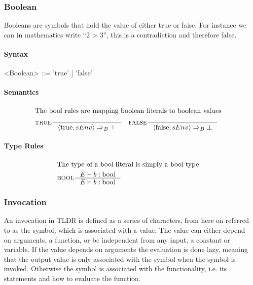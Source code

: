 \subsubsection{Boolean}
Booleans are symbols that hold the value of either true or false. For instance we can in mathematics write \enquote{2 > 3}, this is a contradiction and therefore false.

\paragraph{Syntax}

\begin{grammar}
<Boolean> ::= 'true' | 'false'
\end{grammar}

\paragraph{Semantics}

\begin{align*}
\intertext{The bool rules are mapping boolean literals to boolean values}
&\inference[TRUE]{}
                   {\Braket{\Ttrue,sEnv} \Rightarrow_B \top}
&\inference[FALSE]{}
                   {\Braket{\Tfalse,sEnv} \Rightarrow_B \bot}
\end{align*}

\paragraph{Type Rules}

\begin{align*}
\intertext{The type of a bool literal is simply a bool type}
&\inference[BOOL]{\Tenv b:\Tbool}
                 {\Tenv b: \Tbool}
\end{align*}

\subsubsection{Invocation}\label{subsubsec:invocation}
An invocation in TLDR is defined as a series of characters, from here on referred to as the symbol, which is associated with a value. The value can either depend on arguments, a function, or be independent from any input, a constant or variable. If the value depends on arguments the evaluation is done lazy, meaning that the output value is only associated with the symbol when the symbol is invoked. Otherwise the symbol is associated with the functionality, i.e. its statements and how to evaluate the function. 

